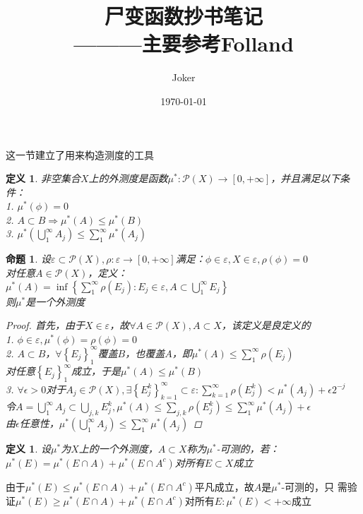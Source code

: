 \documentclass[12pt, a4paper, oneside]{ctexbook}
\title{{\Huge{\textbf{尸变函数抄书笔记}}}\\———主要参考Folland}
\author{Joker}
\date{\today}
\newtheorem{definition}[theorem]{定义}
\newtheorem{proposition}[theorem]{命题}
\begin{document}
这一节建立了用来构造测度的工具
\begin{definition}
    非空集合$X$上的外测度是函数$\mu^*:\mathcal{P}(X)\rightarrow [0,+\infty]$，并且满足以下条件：\\
    1. $\mu^*(\phi)=0$\\
    2. $A\subset B\Rightarrow \mu^*(A)\leq \mu^*(B)$\\
    3. $\mu^*(\bigcup_1^{\infty}A_j)\leq \sum_1^{\infty}\mu^*(A_j)$
\end{definition}
\begin{proposition}
    设$\varepsilon\subset\mathcal{P}(X),\rho:\varepsilon\rightarrow [0,+\infty]$满足：$\phi\in\varepsilon,X\in\varepsilon,\rho(\phi)=0$\\
    对任意$A\in\mathcal{P}(X)$，定义：\\
    $\mu^*(A)=\inf\left\{\sum_1^{\infty}\rho(E_j):E_j\in\varepsilon,A\subset\bigcup_1^{\infty}E_j\right\}$\\
    则$\mu^*$是一个外测度
    \begin{proof}
        首先，由于$X\in\varepsilon$，故$\forall A\in\mathcal{P}(X),A\subset X$，该定义是良定义的\\
        1. $\phi\in\varepsilon,\mu^*(\phi)=\rho(\phi)=0$\\
        2. $A\subset B$，$\forall\left\{E_j\right\}_1^{\infty}$覆盖$B$，也覆盖$A$，即$\mu^*(A)\leq\sum_1^{\infty}\rho(E_j)$\\
        对任意$\left\{E_j\right\}_1^{\infty}$成立，于是$\mu^*(A)\leq\mu^*(B)$\\
        3. $\forall \epsilon>0$对于$A_j\in\mathcal{P}(X),\exists\left\{E_j^k\right\}_{k=1}^{\infty}\subset\varepsilon:\sum_{k=1}^{\infty}\rho(E_j^k)<\mu^*(A_j)+\epsilon2^{-j}$\\
        令$A=\bigcup_1^{\infty}A_j\subset\bigcup_{j,k}E_j^k,\mu^*(A)\leq\sum_{j,k}\rho(E_j^k)\leq\sum_1^{\infty}\mu^*(A_j)+\epsilon$\\
        由$\epsilon$任意性，$\mu^*(\bigcup_1^{\infty}A_j)\leq\sum_1^{\infty}\mu^*(A_j)$
    \end{proof}
\end{proposition}
\begin{definition}
    设$\mu^*$为$X$上的一个外测度，$A\subset X$称为$\mu^*$-可测的，若：\\
    $\mu^*(E)=\mu^*(E\cap A)+\mu^*(E\cap A^c)$对所有$E\subset X$成立
\end{definition}
由于$\mu^*(E)\leq\mu^*(E\cap A)+\mu^*(E\cap A^c)$平凡成立，故$A$是$\mu^*$-可测的，只
需验证$\mu^*(E)\geq\mu^*(E\cap A)+\mu^*(E\cap A^c)$对所有$E:\mu^*(E)<+\infty$成立
\end{document}
